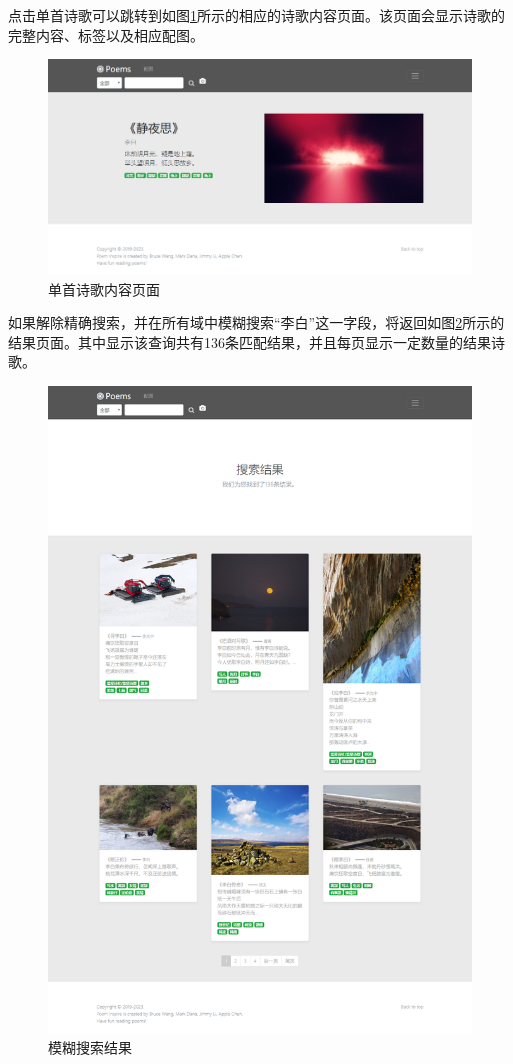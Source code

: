 \documentclass[a4paper, 10pt]{article}
\begin{document}
点击单首诗歌可以跳转到如图\ref{fig:demo_poempage}所示的相应的诗歌内容页面。该页面会显示诗歌的完整内容、标签以及相应配图。

\begin{figure}[H]
\centering
\includegraphics[scale=0.48]{fig/demo_poempage.png}
\caption{单首诗歌内容页面}
\label{fig:demo_poempage}
\end{figure}

如果解除精确搜索，并在所有域中模糊搜索“李白”这一字段，将返回如图\ref{fig:demo_vagueres}所示的结果页面。其中显示该查询共有136条匹配结果，并且每页显示一定数量的结果诗歌。

\begin{figure}[H]
\centering
\includegraphics[scale=0.475]{fig/demo_vagueres.png}
\caption{模糊搜索结果}
\label{fig:demo_vagueres}
\end{figure}
\end{document}
